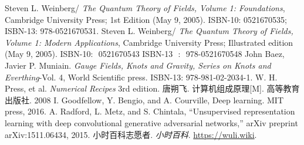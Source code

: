 \begin{thebibliography}{99}
Steven L. Weinberg/ \textsl{The Quantum Theory of Fields, Volume 1: Foundations}, Cambridge University Press; 1st Edition (May 9, 2005). ISBN-10: 0521670535; ISBN-13: 978-0521670531. 
Steven L. Weinberg/ \textsl{The Quantum Theory of Fields, Volume 1: Modern Applications}, Cambridge University Press; Illustrated edition (May 9, 2005). ISBN-10: ‎ 0521670543
ISBN-13 ‏ : ‎ 978-0521670548
John Baez, Javier P. Muniain. \textsl{Gauge Fields, Knots and Gravity, Series on Knots and Everthing}-Vol. 4, World Scientific press. ISBN-13: 978-981-02-2034-1. 
W. H. Press, et al. \textsl{Numerical Recipes} 3rd edition. 
唐朔飞. 计算机组成原理[M]. 高等教育出版社. 2008
I. Goodfellow, Y. Bengio, and A. Courville, Deep learning. MIT press, 2016.
A. Radford, L. Metz, and S. Chintala, “Unsupervised representation learning with deep convolutional generative adversarial networks,” arXiv preprint arXiv:1511.06434, 2015.
小时百科志愿者. \textsl{小时百科}. \href{https://wuli.wiki}{https://wuli.wiki}. 
\end{thebibliography}

